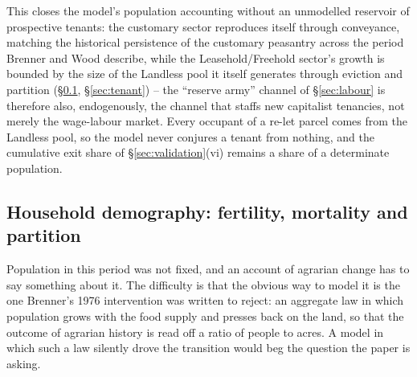 \documentclass[11pt,english]{article}
\begin{document}
This closes the model's population accounting without an unmodelled reservoir of prospective tenants: the customary sector reproduces itself through conveyance, matching the historical persistence of the customary peasantry across the period Brenner and Wood describe, while the Leasehold/Freehold sector's growth is bounded by the size of the Landless pool it itself generates through eviction and partition (\S\ref{sec:demography}, \S\ref{sec:tenant}) -- the ``reserve army'' channel of \S\ref{sec:labour} is therefore also, endogenously, the channel that staffs new capitalist tenancies, not merely the wage-labour market. Every occupant of a re-let parcel comes from the Landless pool, so the model never conjures a tenant from nothing, and the cumulative exit share of \S\ref{sec:validation}(vi) remains a share of a determinate population.

\subsection{Household demography: fertility, mortality and partition}
\label{sec:demography}

Population in this period was not fixed, and an account of agrarian change has to say something about it. The difficulty is that the obvious way to model it is the one Brenner's 1976 intervention was written to reject: an aggregate law in which population grows with the food supply and presses back on the land, so that the outcome of agrarian history is read off a ratio of people to acres. A model in which such a law silently drove the transition would beg the question the paper is asking.
\end{document}
